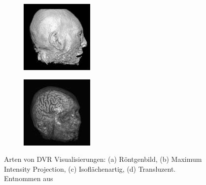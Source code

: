 \documentclass[a4paper,fontsize=12pt,toc=bib,parskip=half,ngerman]{scrartcl}
\begin{document}
\begin{figure}
\begin{subfigure}{0.24\textwidth}
		\subcaption{}
		\label{DVR:MIP}
	\end{subfigure}
	\begin{subfigure}{0.24\textwidth}
		\includegraphics[width=\textwidth]{pictures/Iso.png}
		\subcaption{}
		\label{DVR:Isosurface}
	\end{subfigure}
	\begin{subfigure}{0.24\textwidth}
		\includegraphics[width=\textwidth]{pictures/Trans.png}
		\subcaption{}
		\label{DVR:Translucent}
	\end{subfigure}
	\caption{Arten von DVR Visualisierungen: (a) R\"ontgenbild, (b) Maximum Intensity Projection, (c) Isofl\"achenartig, (d) Transluzent. Entnommen aus \cite[S.~134]{hansen2005visualization}}
	\label{DVRModes}
\end{figure}
\end{document}
